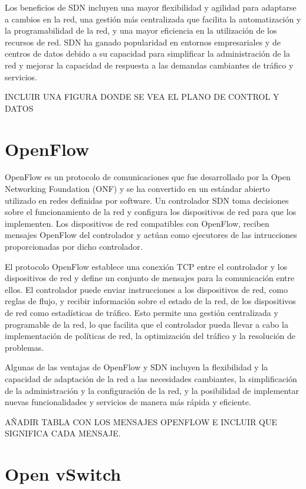 \documentclass[a4paper, 12pt]{book}
\begin{document}
	Los beneficios de SDN incluyen una mayor flexibilidad y agilidad para adaptarse a cambios en la red, una gestión más centralizada que facilita la automatización y la programabilidad de la red, y una mayor eficiencia en la utilización de los recursos de red. SDN ha ganado popularidad en entornos empresariales y de centros de datos debido a su capacidad para simplificar la administración de la red y mejorar la capacidad de respuesta a las demandas cambiantes de tráfico y servicios.
	
	INCLUIR UNA FIGURA DONDE SE VEA EL PLANO DE CONTROL Y DATOS
	
	\section{OpenFlow}
	\label{sec:openflow}
	
	
	OpenFlow es un protocolo de comunicaciones que fue desarrollado por la Open Networking Foundation (ONF) y se ha convertido en un estándar abierto utilizado en redes definidas por software.
	Un controlador SDN toma decisiones sobre el funcionamiento de la red y configura los dispositivos de red para que los implementen. Los dispositivos de red compatibles con OpenFlow, reciben mensajes  OpenFlow del controlador y actúan como ejecutores de las intrucciones proporcionadas por dicho controlador.
	
	El protocolo OpenFlow establece una conexión TCP entre el controlador y los dispositivos de red  y define un conjunto de mensajes para la comunicación entre ellos. El controlador puede enviar instrucciones a los dispositivos de red, como reglas de flujo, y recibir información sobre el estado de la red, de los dispositivos de red como estadísticas de tráfico. Esto permite una gestión centralizada y programable de la red, lo que facilita que el controlador pueda llevar a cabo la implementación de políticas de red, la optimización del tráfico y la resolución de problemas.

	
	Algunas de las ventajas de OpenFlow y SDN incluyen la flexibilidad y la capacidad de adaptación de la red a las necesidades cambiantes, la simplificación de la administración y la configuración de la red, y la posibilidad de implementar nuevas funcionalidades y servicios de manera más rápida y eficiente.
	
	AÑADIR TABLA CON LOS MENSAJES OPENFLOW E INCLUIR QUE SIGNIFICA CADA MENSAJE.
	
	\section{Open vSwitch} 
	\label{sec:vswitch}
	
\end{document}
